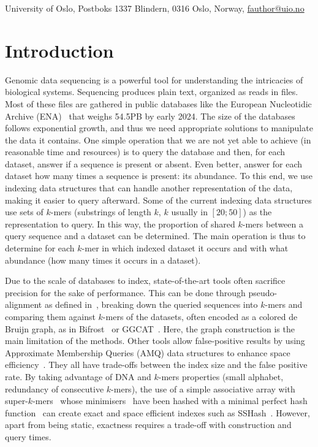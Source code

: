 \footnotetext
{%
    University of Oslo,
    Postboks 1337 Blindern, 0316 Oslo, Norway,
    \href{mailto:fauthor@uio.no}{fauthor@uio.no}
}

\section{Introduction}

Genomic data sequencing is a powerful tool for understanding the intricacies of biological systems. Sequencing produces plain text, organized as reads in files. Most of these files are gathered in public databases like the European Nucleotidic Archive (ENA)~\cite{burgin2023european} that weighs 54.5PB by early 2024. The size of the databases follows exponential growth, and thus we need appropriate solutions to manipulate the data it contains. One simple operation that we are not yet able to achieve (in reasonable time and resources) is to query the database and then, for each dataset, answer if a sequence is present or absent. Even better, answer for each dataset how many times a sequence is present: its abundance. To this end, we use indexing data structures that can handle another representation of the data, making it easier to query afterward. Some of the current indexing data structures use sets of $k$-mers (substrings of length $k$, $k$ usually in $[20;50]$) as the representation to query. In this way, the proportion of shared $k$-mers between a query sequence and a dataset can be determined. The main operation is thus to determine for each $k$-mer in which indexed dataset it occurs and with what abundance (how many times it occurs in a dataset).

Due to the scale of databases to index, state-of-the-art tools often sacrifice precision for the sake of performance. This can be done through pseudo-alignment as defined in~\cite{themisto_2023}, breaking down the queried sequences into $k$-mers and comparing them against $k$-mers of the datasets, often encoded as a colored de Bruijn graph, as in Bifrost~\cite{bifrost_2020} or GGCAT~\cite{ggcat_2023}. Here, the graph construction is the main limitation of the methods. Other tools allow false-positive results by using Approximate Membership Queries (AMQ) data structures to enhance space efficiency~\cite{bigsi_2019, cobs_2019, squeakr_2018, kmtricks_2022, metaprofi_2023,  pac_2023}. They all have trade-offs between the index size and the false positive rate. By taking advantage of DNA and $k$-mers properties (small alphabet, redundancy of consecutive $k$-mers), the use of a simple associative array with super-$k$-mers~\cite{superkmer_2013} whose minimisers~\cite{minimisers_2004} have been hashed with a minimal perfect hash function~\cite{pthash_2021} can create exact and space efficient indexes such as SSHash~\cite{sshash_2022, sshash_2023}. However, apart from being static, exactness requires a trade-off with construction and query times.


